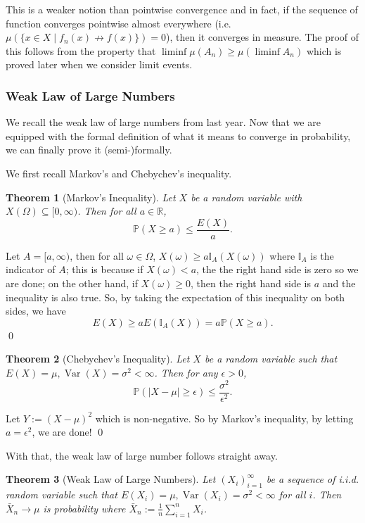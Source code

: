 \documentclass[
]{article}
\newtheorem{theorem}{Theorem}
\theoremstyle{definition}
\begin{document}
This is a weaker notion than pointwise convergence and in fact, if the
sequence of function converges pointwise almost everywhere
(i.e.~\(\mu(\{x \in X \mid f_n(x) \not\to f(x)\}) = 0\)), then it
converges in measure. The proof of this follows from the property that
\(\liminf \mu(A_n) \ge \mu(\liminf A_n)\) which is proved later when we
consider limit events.

\hypertarget{weak-law-of-large-numbers}{%
\subsubsection{Weak Law of Large
Numbers}\label{weak-law-of-large-numbers}}

We recall the weak law of large numbers from last year. Now that we are
equipped with the formal definition of what it means to converge in
probability, we can finally prove it (semi-)formally.

We first recall Markov's and Chebychev's inequality.

\begin{theorem}[Markov's Inequality]
  Let \(X\) be a random variable with \(X(\Omega) \subseteq [0, \infty)\). Then 
  for all \(a \in \mathbb{R}\),
  \[\mathbb{P}(X \ge a) \le \frac{E(X)}{a}.\]
\end{theorem}
\proof

Let \(A = [a, \infty)\), then for all \(\omega \in \Omega\),
\(X(\omega) \ge a\mathbb{I}_A(X(\omega))\) where \(\mathbb{I}_A\) is the
indicator of \(A\); this is because if \(X(\omega) < a\), the the right
hand side is zero so we are done; on the other hand, if
\(X(\omega) \ge 0\), then the right hand side is \(a\) and the
inequality is also true. So, by taking the expectation of this
inequality on both sides, we have
\[E(X) \ge a E(\mathbb{I}_A(X)) = a \mathbb{P}(X \ge a).\] \qed

\begin{theorem}[Chebychev's Inequality]
  Let \(X\) be a random variable such that \(E(X) = \mu, \mathop{\mathrm{Var}}(X) = \sigma ^2 < \infty\).
  Then for any \(\epsilon > 0\),
  \[\mathbb{P}(\left|X - \mu \right| \ge \epsilon) \le \frac{\sigma ^2}{\epsilon^2}.\]
\end{theorem}
\proof

Let \(Y := (X - \mu)^2\) which is non-negative. So by Markov's
inequality, by letting \(a = \epsilon ^2\), we are done! \qed

With that, the weak law of large number follows straight away.

\begin{theorem}[Weak Law of Large Numbers]
  Let \((X_i)_{i = 1}^\infty\) be a sequence of i.i.d. random variable such that 
  \(E(X_i) = \mu, \mathop{\mathrm{Var}}(X_i) = \sigma ^2 < \infty\) for all \(i\). 
  Then \(\bar{X}_n \to \mu\) is probability where \(\bar{X}_n := 
  \frac{1}{n} \sum_{i = 1}^n X_i\).
\end{theorem}
\proof
\end{document}
